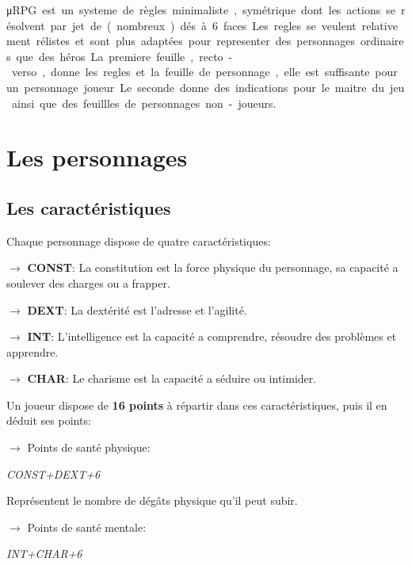 ﻿\begin{landscape}
\begin{multicols}{4}


\date{} %
\maketitle{}

\si\micro RPG est un systeme de règles minimaliste, symétrique dont les actions se résolvent par jet de (nombreux) dés à 6 faces.
Les regles se veulent relativement rélistes et sont plus adaptées pour representer des personnages ordinaires que des héros.

La premiere feuille, recto-verso, donne les regles et la feuille de personnage, elle est suffisante pour un personnage joueur.
Le seconde donne des indications pour le maitre du jeu ainsi que des feuillles de personnages non-joueurs.

\section{Les personnages} 


\subsection{Les caractéristiques}

Chaque personnage dispose de quatre caractéristiques:


$\rightarrow$ \textbf{CONST}: La constitution est la force physique du personnage, sa capacité a soulever des charges ou a frapper.

$\rightarrow$ \textbf{DEXT}: La dextérité  est l'adresse et l'agilité.

$\rightarrow$ \textbf{INT}: L'intelligence est la capacité a comprendre, résoudre des problèmes et apprendre.

$\rightarrow$ \textbf{CHAR}: Le charisme est la capacité a séduire ou intimider.


Un joueur dispose de \textbf{16 points} à répartir dans ces caractéristiques, puis il en déduit ses points:


$\rightarrow$ Points de santé physique:

\textit{CONST+DEXT+6}

Représentent le nombre de dégâts physique qu'il peut subir.


$\rightarrow$ Points de santé mentale:

\textit{INT+CHAR+6}


\end{multicols}
\end{landscape}
